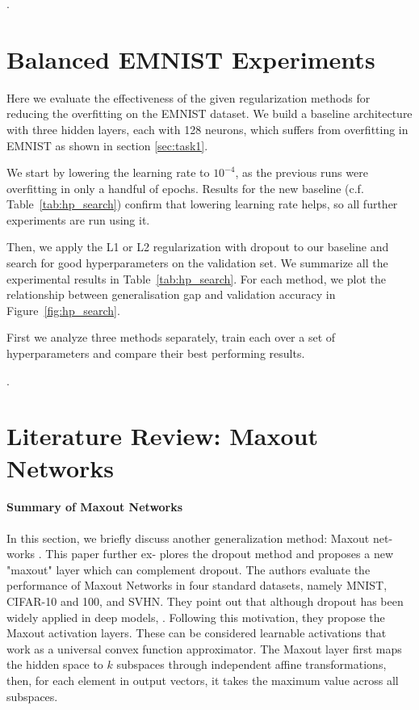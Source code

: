 \documentclass{article}
\begin{document}
\questionFourteen.



\section{Balanced EMNIST Experiments}

\questionTableThree

\questionFigureFour

\label{sec:task2.2}

Here we evaluate the effectiveness of the given regularization methods for reducing the overfitting on the EMNIST dataset.
We build a baseline architecture with three hidden layers, each with 128 neurons, which suffers from overfitting in EMNIST as shown in section \ref{sec:task1}.

We start by lowering the learning rate to $10^{-4}$, as the previous runs were overfitting in only a handful of epochs. Results for the new baseline (c.f. Table~\ref{tab:hp_search}) confirm that lowering learning rate helps, so all further experiments are run using it.

Then, we apply the L1 or L2 regularization with dropout to our baseline and search for good hyperparameters on the validation set. 
We summarize all
the experimental results in Table~\ref{tab:hp_search}. For each method, we
plot the relationship between generalisation gap and validation accuracy in Figure~\ref{fig:hp_search}.

First we analyze three methods separately, train each over a set of hyperparameters and compare their best performing results.

\questionFifteen.


\section{Literature Review: Maxout Networks}
\label{sec:task3}

\paragraph{Summary of Maxout Networks} In this section, we
briefly discuss another generalization method: Maxout net-
works \cite{goodfellow2013maxout}. This paper further ex-
plores the dropout method and proposes a new "maxout" layer
 which can complement dropout.
The authors evaluate the performance of Maxout Networks
in four standard datasets, namely MNIST, CIFAR-10
and 100, and SVHN. They point out that although
dropout has been widely applied in deep models, \questionSixteen. Following this 
motivation, they propose the Maxout activation layers. These can be considered learnable activations that work as a universal convex function approximator. The Maxout layer first
maps the hidden space to $k$ subspaces through independent
affine transformations, then, for each element in output
vectors, it takes the maximum value across all subspaces.
\end{document}
